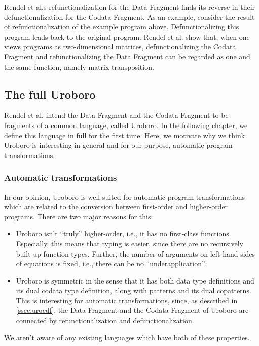 Rendel et al.s refunctionalization for the Data Fragment finds its reverse in their defunctionalization for the Codata Fragment. As an example, consider the result of refunctionalization of the example program above. Defunctionalizing this program leads back to the original program. Rendel et al. show that, when one views programs as two-dimensional matrices, defunctionalizing the Codata Fragment and refunctionalizing the Data Fragment can be regarded as one and the same function, namely matrix transposition.

\subsection{The full Uroboro}
\label{ssec:urofull}

Rendel et al. intend the Data Fragment and the Codata Fragment to be fragments of a common language, called Uroboro. In the following chapter, we define this language in full for the first time. Here, we motivate why we think Uroboro is interesting in general and for our purpose, automatic program transformations.

\subsubsection{Automatic transformations}

In our opinion, Uroboro is well suited for automatic program transformations which are related to the conversion between first-order and higher-order programs. There are two major reasons for this:
\begin{itemize}
\item Uroboro isn't ``truly'' higher-order, i.e., it has no first-class functions. Especially, this means that typing is easier, since there are no recursively built-up function types. Further, the number of arguments on left-hand sides of equations is fixed, i.e., there can be no ``underapplication''.

\item Uroboro is symmetric in the sense that it has both data type definitions and its dual codata type definition, along with patterns and its dual copatterns. This is interesting for automatic transformations, since, as described in \autoref{ssec:urocdf}, the Data Fragment and the Codata Fragment of Uroboro are connected by refunctionalization and defunctionalization.
\end{itemize}
We aren't aware of any existing languages which have both of these properties.

